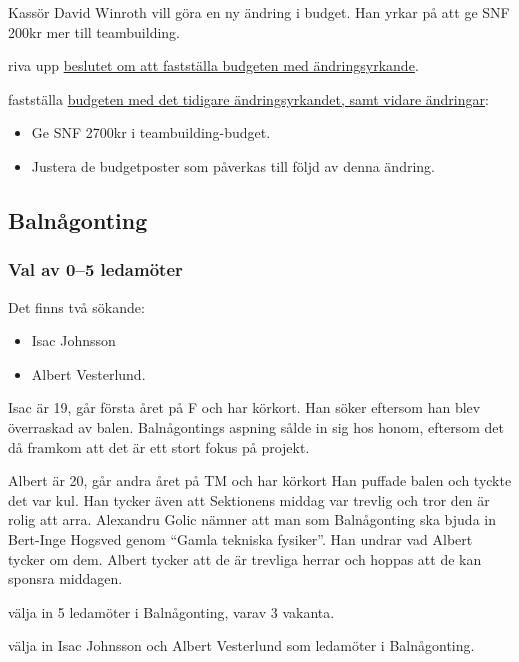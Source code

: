 \documentclass[hidelinks]{sektionsmote}
\begin{document}
\begin{ofraga} \label{uppriven-budget}
    Kassör David Winroth vill göra en ny ändring i budget.
    Han yrkar på att ge SNF 200kr mer till teambuilding.
    \begin{beslut}
        \item riva upp \hyperref[budget-orginalbeslut]{beslutet om att fastställa budgeten med ändringsyrkande}.
        \item fastställa \hyperlink{bilagor/styret/ny-budget2.pdf.1}{budgeten med det tidigare ändringsyrkandet, samt vidare ändringar}:
        \begin{itemize}
            \item Ge SNF 2700kr i teambuilding-budget.
            \item Justera de budgetposter som påverkas till följd av denna ändring.
        \end{itemize}
    \end{beslut}
\end{ofraga}

\subsection{Balnågonting}

\subsubsection{Val av 0--5 ledamöter}
Det finns två sökande:
\begin{itemize}
    \item Isac Johnsson
    \item Albert Vesterlund.
\end{itemize}

Isac är 19, går första året på F och har körkort.
Han söker eftersom han blev överraskad av balen.
Balnågontings aspning sålde in sig hos honom, eftersom det då framkom att det är ett stort fokus på projekt.

Albert är 20, går andra året på TM och har körkort
Han puffade balen och tyckte det var kul.
Han tycker även att Sektionens middag var trevlig och tror den är rolig att arra.
Alexandru Golic nämner att man som Balnågonting ska bjuda in Bert-Inge Hogsved genom \enquote{Gamla tekniska fysiker}.
Han undrar vad Albert tycker om dem.
Albert tycker att de är trevliga herrar och hoppas att de kan sponsra middagen.
\begin{beslut}
    \item välja in 5 ledamöter i Balnågonting, varav 3 vakanta.
    \item välja in Isac Johnsson och Albert Vesterlund som ledamöter i Balnågonting.
\end{beslut}
\end{document}
